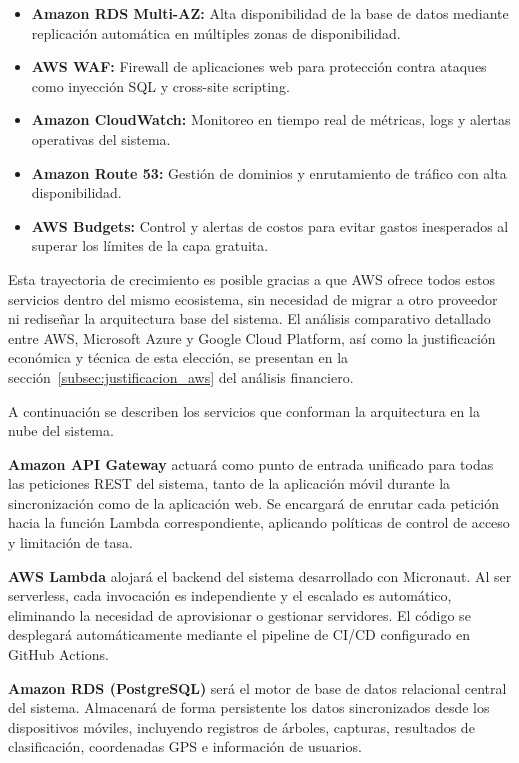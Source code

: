 \begin{itemize}
    \item \textbf{Amazon RDS Multi-AZ:} Alta disponibilidad de la
    base de datos mediante replicación automática en múltiples zonas
    de disponibilidad.
    \item \textbf{AWS WAF:} Firewall de aplicaciones web para
    protección contra ataques como inyección SQL y cross-site scripting.
    \item \textbf{Amazon CloudWatch:} Monitoreo en tiempo real de
    métricas, logs y alertas operativas del sistema.
    \item \textbf{Amazon Route 53:} Gestión de dominios y enrutamiento
    de tráfico con alta disponibilidad.
    \item \textbf{AWS Budgets:} Control y alertas de costos para
    evitar gastos inesperados al superar los límites de la capa gratuita.
\end{itemize}

Esta trayectoria de crecimiento es posible gracias a que AWS ofrece
todos estos servicios dentro del mismo ecosistema, sin necesidad de
migrar a otro proveedor ni rediseñar la arquitectura base del sistema.
El análisis comparativo detallado entre AWS, Microsoft Azure y Google
Cloud Platform, así como la justificación económica y técnica de esta
elección, se presentan en la sección~\ref{subsec:justificacion_aws}
del análisis financiero.

A continuación se describen los servicios que conforman la arquitectura
en la nube del sistema.

\textbf{Amazon API Gateway} actuará como punto de entrada unificado
para todas las peticiones REST del sistema, tanto de la aplicación
móvil durante la sincronización como de la aplicación web. Se encargará
de enrutar cada petición hacia la función Lambda correspondiente,
aplicando políticas de control de acceso y limitación de tasa.

\textbf{AWS Lambda} alojará el backend del sistema desarrollado con
Micronaut. Al ser serverless, cada invocación es independiente y el
escalado es automático, eliminando la necesidad de aprovisionar o
gestionar servidores. El código se desplegará automáticamente mediante
el pipeline de CI/CD configurado en GitHub Actions.

\textbf{Amazon RDS (PostgreSQL)} será el motor de base de datos
relacional central del sistema. Almacenará de forma persistente los
datos sincronizados desde los dispositivos móviles, incluyendo
registros de árboles, capturas, resultados de clasificación,
coordenadas GPS e información de usuarios.

